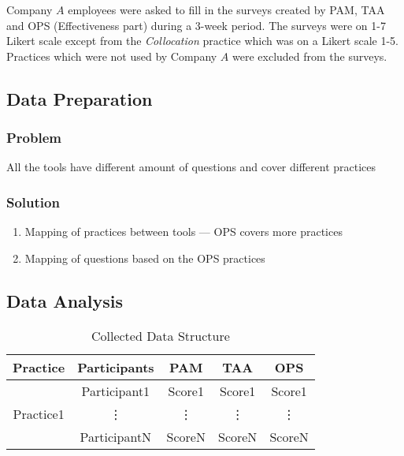 Company $A$ employees were asked to fill in the surveys created by PAM, TAA and OPS (Effectiveness part) during a 3-week period. The surveys were on 1-7 Likert scale except from the \textit{Collocation} practice which was on a Likert scale 1-5.
Practices which were not used by Company $A$ were excluded from the surveys.

\clearpage


\subsection{Data Preparation}

\subsubsection{Problem}
All the tools have different amount of questions and cover different practices

\subsubsection{Solution}
\begin{enumerate}
	\item Mapping of practices between tools --- OPS covers more practices
	\item Mapping of questions based on the OPS practices
\end{enumerate}

\clearpage


\subsection{Data Analysis}

\begin{table} [H]
\centering
	\begin{tabular}{| c | c | c | c | c |} \hline
	\textbf{Practice} & \textbf{Participants} & \textbf{PAM} & \textbf{TAA} & \textbf{OPS} \\ \hline
	\multirow{3}{*}{Practice1} & Participant1 & Score1 & Score1 & Score1 \\ \hhline{~----}
	& \vdots & \vdots & \vdots  & \vdots \\ \hhline{~----}
	& ParticipantN & ScoreN & ScoreN & ScoreN \\ \hline
	\end{tabular}
	\caption{Collected Data Structure}
	\label{table:data_structure}
\end{table}

